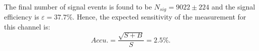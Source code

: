 \documentclass[11pt,a4paper]{cepcnote}
\begin{document}
The final number of signal events is found to be $N_{sig} = 9022\pm224 $
and the signal efficiency is $\varepsilon = 37.7\%$. 
Hence, the expected sensitivity of the measurement for this channel is:
\begin{equation*}
Accu.=\frac{\sqrt{S+B}}{S} = 2.5\%.
\end{equation*}

%
\end{document}
